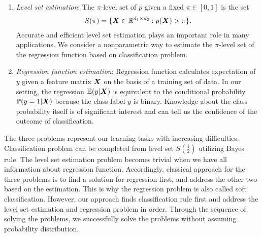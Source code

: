 \documentclass[mathptm]{statsoc}
\begin{document}
\begin{enumerate}[wide, labelwidth=!, labelindent=0pt]
\item {\it Level set estimation}: The $\pi$-level set of $p$ given a fixed $\pi\in[0,1]$ is the set 
\begin{align}
S(\pi) = \{\bm X\in\mathbb{R}^{d_1\times d_2}: p(\bm X)>\pi\}.
\end{align}
 Accurate and efficient level set estimation plays an important role in many applications.
 We consider a nonparametric way to estimate the $\pi$-level set of the regression function based on classification problem.

\item {\it Regression function estimation}: Regression function calculates expectation of $y$ given a feature matrix $\bm X$ on the basis of a training set of data. In our setting, the regression $ \mathbb{E}(y|\bm X)$  is equivalent to  the conditional probability $\mathbb{P}(y = 1|\bm X)$ because the class label $y$ is binary. Knowledge about the class probability itself is of significant interest and can tell us the confidence of the outcome of classification. 

\end{enumerate}

The three problems represent our learning tasks with increasing difficulties. 
Classification problem can be completed from level set $S(\frac{1}{2})$ utilizing Bayes rule. The level set estimation problem becomes trivial when we have all information about regression function.  
Accordingly, classical approach for the three problems is to find a solution for regression first, and address the other two based on the estimation. This is why the regression problem is also called soft classification. However, our approach finds classification rule first and address the level set estimation and regression problem in order. Through the sequence of solving the problems, we successfully solve the problems without assuming probability distribution.
\end{document}
